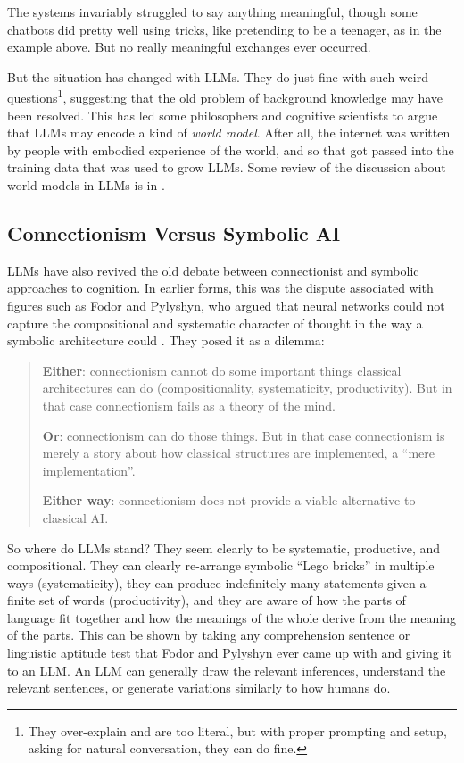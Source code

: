The systems invariably struggled to say anything meaningful, though some chatbots did pretty well using tricks, like pretending to be a teenager, as in the example above. But no really meaningful exchanges ever occurred.

But the situation has changed with LLMs. They do just fine with such weird questions\footnote{They over-explain and are too literal, but with proper prompting and setup, asking for natural conversation, they can do fine.}, suggesting that the old problem of background knowledge may have been resolved.  This has led some philosophers and cognitive scientists to argue that
LLMs may encode a kind of \emph{world model}. After all, the internet was written by people with embodied experience of the world, and so that got passed into the training data that was used to grow LLMs. Some review of the discussion about world models in LLMs is in \cite{chalmers2023llmconscious}.

\subsection{Connectionism Versus Symbolic AI}

LLMs have also revived the old debate between connectionist and symbolic
approaches to cognition. In earlier forms, this was the dispute associated with
figures such as Fodor and Pylyshyn, who argued that neural networks could not
capture the compositional and systematic character of thought in the way a
symbolic architecture could \cite{fodor1988connectionism}. They posed it as a dilemma:

\begin{quote}
\textbf{Either}: connectionism cannot do some important things classical architectures can do (compositionality, systematicity, productivity). But in that case connectionism fails as a theory of the mind.

\textbf{Or}: connectionism can do those things. But in that case connectionism is merely a story about how classical structures are implemented, a ``mere implementation''.

\textbf{Either way}: connectionism does not provide a viable alternative to classical AI.
\end{quote}

So where do LLMs stand? They seem clearly to be systematic, productive, and compositional. They can clearly re-arrange symbolic ``Lego bricks'' in multiple ways (systematicity), they can produce indefinitely many statements given a finite set of words (productivity), and they are aware of how the parts of language fit together and how the meanings of the whole derive from the meaning of the parts. This can be shown by taking any comprehension sentence or linguistic aptitude test that Fodor and Pylyshyn ever came up with and giving it to an LLM. An LLM can generally draw the relevant inferences, understand the relevant sentences, or generate variations similarly to how humans do.

